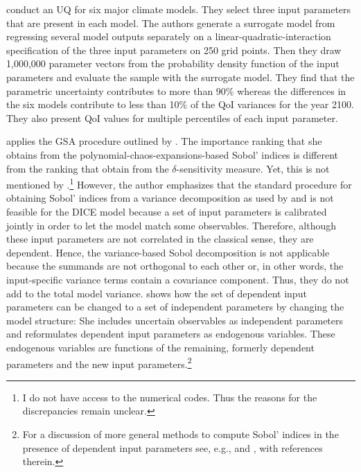 \cite{Gillingham.2015} conduct an UQ for six major climate models. They select three input parameters that are present in each model. The authors generate a surrogate model from regressing several model outputs separately on a linear-quadratic-interaction specification of the three input parameters on 250 grid points. Then they draw 1,000,000 parameter vectors from the probability density function of the input parameters and evaluate the sample with the surrogate model. They find that the parametric uncertainty contributes to more than 90\% whereas the differences in the six models contribute to less than 10\% of the QoI variances for the year 2100. They also present QoI values for multiple percentiles of each input parameter.

\cite{Miftakhova.2018} applies the GSA procedure outlined by \cite{Harenberg.2019}. The importance ranking that she obtains from the polynomial-chaos-expansions-based Sobol' indices is different from the ranking that \cite{Anderson.2014} obtain from the $\delta$-sensitivity measure. Yet, this is not mentioned by \citeauthor{Miftakhova.2018}.\footnote{I do not have access to the numerical codes. Thus the reasons for the discrepancies remain unclear.} However, the author emphasizes that the standard procedure for obtaining Sobol' indices from a variance decomposition as used by \cite{Anderson.2014} and \cite{Butler.2014} is not feasible for the DICE model because a set of input parameters is calibrated jointly in order to let the model match some observables. Therefore, although these input parameters are not correlated in the classical sense, they are dependent. Hence, the variance-based Sobol decomposition is not applicable because the summands are not orthogonal to each other or, in other words, the input-specific variance terms contain a covariance component. Thus, they do not add to the total model variance. \cite{Miftakhova.2018} shows how the set of dependent input parameters can be changed to a set of independent parameters by changing the model structure: She includes uncertain observables as independent parameters and reformulates dependent input parameters as endogenous variables. These endogenous variables are functions of the remaining, formerly dependent parameters and the new input parameters.\footnote{For a discussion of more general methods to compute Sobol' indices in the presence of dependent input parameters see, e.g., \cite{Chastaing.2015} and \cite{Wiederkehr.2018}, with references therein.}\\
\newline
